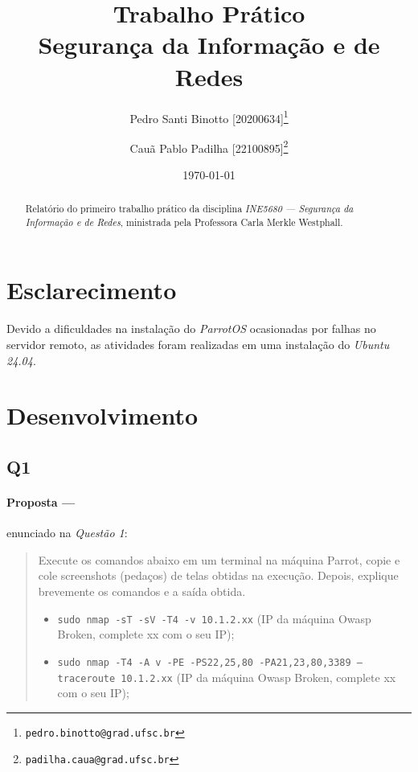 \documentclass[12pt]{article}
\title{Trabalho Prático \RNum{1} \\ [0.2em]\smaller{}Segurança da Informação e de Redes}
\author[1]{Pedro Santi Binotto [20200634]\thanks{\texttt{pedro.binotto@grad.ufsc.br}}}
\author[2]{Cauã Pablo Padilha [22100895]\thanks{\texttt{padilha.caua@grad.ufsc.br}}}
\date{\today}
\affil[1]{Departamento de Informática e Estatística, Universidade Federal de Santa Catarina}
\begin{document}
\begin{titlepage}
\maketitle
\thispagestyle{empty}

\begin{abstract}
  Relatório do primeiro trabalho prático da disciplina \textit{INE5680 --- Segurança da Informação e de Redes}, ministrada
  pela Professora Carla Merkle Westphall.
\end{abstract}

\end{titlepage}

\tableofcontents

\printglossary[title=Glossário, toctitle=Glossário]

\section{Esclarecimento}

\paragraph{}

Devido a dificuldades na instalação do \textit{ParrotOS} ocasionadas por falhas no servidor remoto, as atividades foram
realizadas em uma instalação do \textit{Ubuntu 24.04}.

\section{Desenvolvimento}

\subsection{Q1}

\paragraph{Proposta ---} enunciado na \textit{Questão 1}:

\begin{quote}
Execute os comandos abaixo em um terminal na máquina Parrot, copie e cole screenshots (pedaços) de telas obtidas na
  execução. Depois, explique brevemente os comandos e a saída obtida. 
  \begin{itemize}
    \item \texttt{sudo nmap -sT -sV -T4 -v 10.1.2.xx} (IP da máquina Owasp Broken, complete xx com o seu IP);
    \item \texttt{sudo nmap -T4 -A v -PE -PS22,25,80 -PA21,23,80,3389 –traceroute 10.1.2.xx} (IP da máquina Owasp
      Broken, complete xx com o seu IP);
  \end{itemize}
\end{quote}
\end{document}
